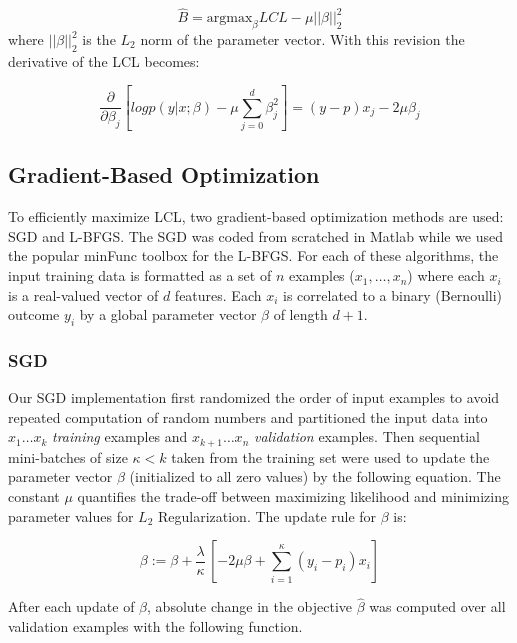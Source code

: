 \documentclass[10pt]{article}
\begin{document}
\begin{equation}
    \hat{B} = \textrm{argmax}_{\beta} LCL - \mu||\beta||_2^2
\end{equation}
where $||\beta||_2^2$ is the $L_2$ norm of the parameter vector. With this revision the derivative of the LCL becomes:

\begin{equation}
    \frac{\partial}{\partial \beta_j} [ log p( y | x ; \beta) -\mu \sum_{j=0}^d \beta_j^2 ] = (y - p) x_j - 2 \mu \beta_j
\end{equation}


\subsection{Gradient-Based Optimization}
To efficiently maximize LCL, two gradient-based optimization methods are used: SGD and L-BFGS. The SGD was coded from scratched in Matlab while we used the popular minFunc toolbox \cite{minFunc} for the L-BFGS. For each of these algorithms, the input training data is formatted as a set of $n$ examples ($x_1, \ldots , x_n$) where each $x_i$ is a real-valued vector of $d$ features. Each $x_i$ is correlated to a binary (Bernoulli) outcome $y_i$ by a global parameter vector $\beta$ of length $d+1$. 


\subsubsection{SGD} 
Our SGD implementation first randomized the order of input examples to avoid repeated computation of random numbers and partitioned the input data into $x_1 \ldots x_k$ \emph{training} examples and $x_{k+1} \ldots x_n$ \emph{validation} examples. Then sequential mini-batches of size $\kappa < k$ taken from the training set were used to update the parameter vector $\beta$ (initialized to all zero values) by the following equation. The constant $\mu$ quantifies the trade-off between maximizing likelihood and minimizing parameter values for $L_2$ Regularization. The update rule for $\beta$ is:

\begin{equation}
    \beta := \beta + \frac{\lambda}{\kappa}\,[-2 \mu \beta + \sum_{i=1}^{\kappa} (y_i - p_i) x_i]
\end{equation}

After each update of $\beta$, absolute change in the objective $\widehat{\beta}$ was computed over all validation examples with the following function.
\end{document}

